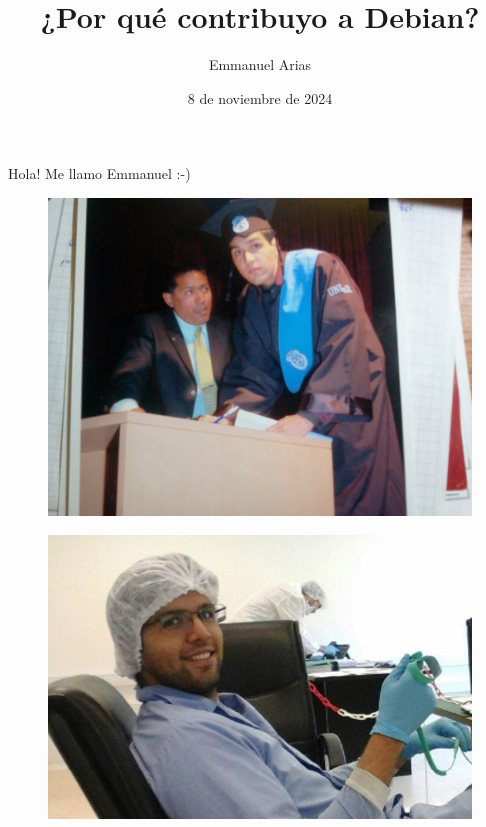 \documentclass{beamer}
\title{¿Por qué contribuyo a Debian?}
\author{Emmanuel Arias}
\date{8 de noviembre de 2024}
\begin{document}
\begin{frame}[plain]
    \maketitle
\end{frame}

\begin{frame}
  \centering
    \Huge Hola! Me llamo Emmanuel :-)
\end{frame}

\begin{frame}
	\begin{figure}
		\centering
		\includegraphics[width=1\linewidth]{images/1}
		\label{fig:UNLAR}
	\end{figure}
\end{frame}

\begin{frame}
	\begin{figure}
		\centering
		\includegraphics[width=1\linewidth]{images/1.2}
		\label{fig:UNLAR}
	\end{figure}
\end{frame}
\end{document}
